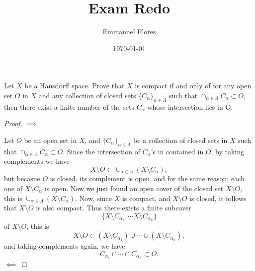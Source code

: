 \documentclass[oneside,english]{amsart}
\numberwithin{equation}{section}
\numberwithin{figure}{section}
\begin{document}
\title{Exam Redo}
\date{\today}
\author{Emmanuel Flores}

\maketitle
Let $X$ be a Hausdorff space. Prove that $X$ is compact if and only of for any open set $O$ in $X$ and any collection of closed sets $\{C_{\alpha}\}_{\alpha\in\Lambda}$ such that $\cap_{\alpha\in\Lambda}C_{\alpha} \subset O$, then there exist a finite number of the sets ${C_{\alpha}}$ whose intersection lies in O.
\begin{proof}
$\implies$ 

Let $O$ be an open set in $X$, and $\{C_{\alpha}\}_{\alpha\in\Lambda}$ be a collection of closed sets in $X$ such that $\cap_{\alpha\in\Lambda}C_{\alpha} \subset O$. Since the intersection of $C_{\alpha}$'s in contained in $O$, by taking complements we have 
\begin{displaymath}
  X\setminus O \subset \cup _{\alpha\in\Lambda} (X\setminus C_{\alpha}),
\end{displaymath}
but becasue $O$ is closed, its complement is open, and for the same reason; each one of $X\setminus C_{\alpha}$ is open.
Now we just found an open cover of the closed set $X\setminus O$, this is $\cup _{\alpha\in\Lambda} (X\setminus C_{\alpha})$. Now, since $X$ is compact, and $X\setminus O$ is closed, it follows that $X\setminus O$ is also compact. Thus there exists a finite subcover 
\begin{displaymath}
  \{ X\setminus C_{\alpha_1},\cdots X\setminus C_{\alpha_n}\}
\end{displaymath}
of $X\setminus O$, this is 
\begin{displaymath}
  X\setminus O\subset (X\setminus C_{\alpha_1})\cup \cdots\cup(X\setminus C_{\alpha_n}),
\end{displaymath}
and taking complements again, we have
\begin{displaymath}
  C_{\alpha_1}\cap\cdots\cap C_{\alpha_n}\subset O.
\end{displaymath}
$\impliedby$


\end{proof}
\end{document}
